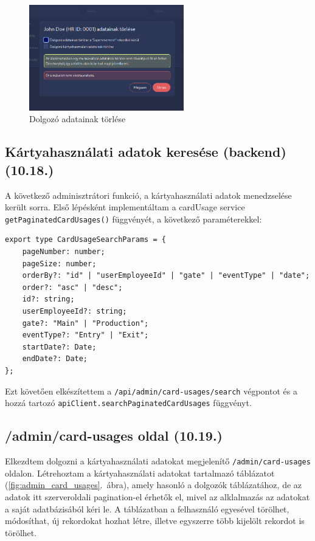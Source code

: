 \documentclass[a4paper]{article}
\newcommand{\inltxt}[1]{\texttt{#1}}
\begin{document}
\begin{figure}[ht]
  \centering
  \includegraphics[width = 0.6\textwidth]{images/delete_employee.png}
  \caption{Dolgozó adatainak törlése}
  \label{fig:delete_employee}
\end{figure}

\subsection{Kártyahasználati adatok keresése (backend) (10.18.)}

A következő adminisztrátori funkció, a kártyahasználati adatok menedzselése került sorra. Első
lépésként implementáltam a cardUsage service \inltxt{getPaginatedCardUsages()} függvényét, a
következő paraméterekkel:

\FloatBarrier
\begin{verbatim}
export type CardUsageSearchParams = {
    pageNumber: number;
    pageSize: number;
    orderBy?: "id" | "userEmployeeId" | "gate" | "eventType" | "date";
    order?: "asc" | "desc";
    id?: string;
    userEmployeeId?: string;
    gate?: "Main" | "Production";
    eventType?: "Entry" | "Exit";
    startDate?: Date;
    endDate?: Date;
};
\end{verbatim}

Ezt követően elkészítettem a \inltxt{/api/admin/card-usages/search} végpontot és a hozzá tartozó
\inltxt{apiClient.searchPaginatedCardUsages} függvényt.

\subsection{/admin/card-usages oldal (10.19.)}

Elkezdtem dolgozni a kártyahasználati adatokat megjelenítő \inltxt{/admin/card-usages} oldalon.
Létrehoztam a kártyahasználati adatokat tartalmazó táblázatot (\ref{fig:admin_card_usages}.~ábra), amely hasonló a dolgozók
táblázatához, de az adatok itt szerveroldali pagination-el érhetők el, mivel az alklalmazás az adatokat
a saját adatbázisából kéri le. A táblázatban a felhasználó egyesével törölhet, módosíthat, új rekordokat
hozhat létre, illetve egyszerre több kijelölt rekordot is törölhet.
\end{document}
